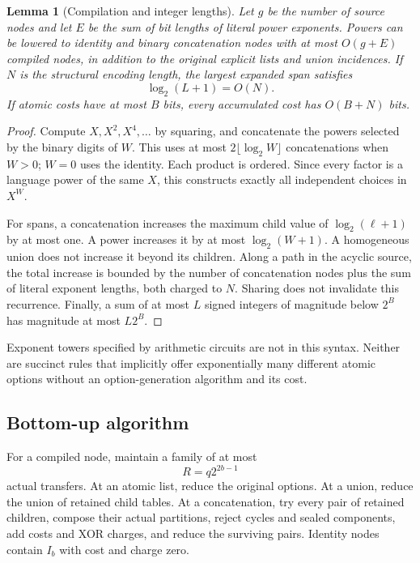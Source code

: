 \documentclass[11pt,a4paper]{article}
\newtheorem{lemma}[lemma]{Lemma}
\theoremstyle{definition}
\begin{document}
\begin{lemma}[Compilation and integer lengths]\label{lem:compile}
Let $g$ be the number of source nodes and let $E$ be the sum of bit lengths of literal power exponents. Powers can be lowered to identity and binary concatenation nodes with at most $O(g+E)$ compiled nodes, in addition to the original explicit lists and union incidences. If $N$ is the structural encoding length, the largest expanded span satisfies
\[
\log_2(L+1)=O(N).
\]
If atomic costs have at most $B$ bits, every accumulated cost has $O(B+N)$ bits.
\end{lemma}
\begin{proof}
Compute $X,X^2,X^4,\ldots$ by squaring, and concatenate the powers selected by the binary digits of $W$. This uses at most $2\lfloor\log_2 W\rfloor$ concatenations when $W>0$; $W=0$ uses the identity. Each product is ordered. Since every factor is a language power of the same $X$, this constructs exactly all independent choices in $X^W$.

For spans, a concatenation increases the maximum child value of $\log_2(\ell+1)$ by at most one. A power increases it by at most $\log_2(W+1)$. A homogeneous union does not increase it beyond its children. Along a path in the acyclic source, the total increase is bounded by the number of concatenation nodes plus the sum of literal exponent lengths, both charged to $N$. Sharing does not invalidate this recurrence. Finally, a sum of at most $L$ signed integers of magnitude below $2^B$ has magnitude at most $L2^B$.
\end{proof}

Exponent towers specified by arithmetic circuits are not in this syntax. Neither are succinct rules that implicitly offer exponentially many different atomic options without an option-generation algorithm and its cost.

\subsection{Bottom-up algorithm}
For a compiled node, maintain a family of at most
\[
R=q2^{2b-1}
\]
actual transfers. At an atomic list, reduce the original options. At a union, reduce the union of retained child tables. At a concatenation, try every pair of retained children, compose their actual partitions, reject cycles and sealed components, add costs and XOR charges, and reduce the surviving pairs. Identity nodes contain $I_b$ with cost and charge zero.
\end{document}

